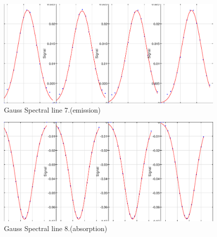 \documentclass[12pt,oneside,a4paper,english]{article}
\begin{document}
\begin{figure}[H]
    \centering
    \includegraphics[width = 1\textwidth ]{figures/gaus_sl_7.eps}
    \caption{Gauss Spectral line 7.(emission) }
    \label{fig:Figure 19}
\end{figure}
\begin{figure}[H]
    \centering
    \includegraphics[width = 1\textwidth ]{figures/gaus_sl_8.eps}
    \caption{Gauss Spectral line 8.(absorption) }
    \label{fig:Figure 20}
\end{figure}
\label{endOfDoc}
\end{document}
